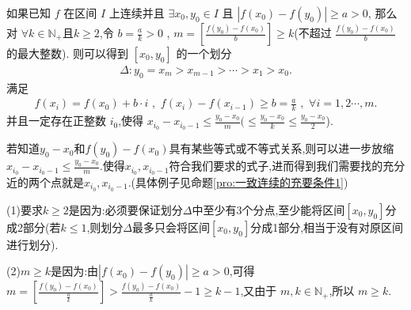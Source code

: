 \documentclass[lang=cn,newtx,10pt,scheme=chinese]{../Template/elegantbook}
\begin{document}
\begin{proposition}\label{pro:连续函数在固定的两点之间寻找充分近的两点,同时保持两点函数值之差足够大}
    如果已知 \(f\) 在区间 \(I\) 上连续并且 \(\exists x_0,y_0\in I\) 且 \(\left| f\left( x_0 \right) -f\left( y_0 \right) \right|\geq a>0\),
    那么对 \(\forall k\in \mathbb{N} _+\)且$k\ge2$,令 \(b = \frac{a}{k}>0\)\,\,,\,\,\(m=\left[ \frac{f\left( y_0 \right) -f\left( x_0 \right)}{b} \right]\geq k\)(不超过 \(\frac{f\left( y_0 \right) -f\left( x_0 \right)}{b}\) 的最大整数).
则可以得到 \(\left[ x_0,y_0 \right]\) 的一个划分 
\begin{align*}
\Delta :y_0=x_m>x_{m - 1}>\cdots >x_1>x_0.
\end{align*}
满足 \begin{align*}
    f\left( x_i \right) = f\left( x_0 \right) + b\cdot i\,\,,\,\,f\left( x_i \right) - f\left( x_{i - 1} \right) \geq b=\frac{a}{k}\,\,,\,\,\forall i = 1,2\cdots,m.
\end{align*}
并且一定存在正整数 \(i_0\),使得 \(x_{i_0}-x_{i_0 - 1}\leq \frac{y_0 - x_0}{m}(\leq \frac{y_0 - x_0}{k}\leq \frac{y_0 - x_0}{2}\)).
\end{proposition}
\begin{remark}
    若知道$y_0-x_0$和$f(y_0)-f(x_0)$具有某些等式或不等式关系,则可以进一步放缩\(x_{i_0}-x_{i_0 - 1}\leq \frac{y_0 - x_0}{m}\).使得$x_{i_0},x_{i_0 - 1}$符合我们要求的式子,进而得到我们需要找的充分近的两个点就是$x_{i_0},x_{i_0 - 1}$.(具体例子见命题\ref{pro:一致连续的充要条件1})
\end{remark}
\begin{note}
   (1)要求$k\ge2$是因为:必须要保证划分$\Delta$中至少有3个分点,至少能将区间$[x_0,y_0]$分成2部分(若$k\le1$,则划分$\Delta$最多只会将区间$[x_0,y_0]$分成1部分,相当于没有对原区间进行划分).

   (2)$m\geq k$是因为:由\(\left| f\left( x_0 \right) -f\left( y_0 \right) \right|\geq a>0\),可得\(m=\left[ \frac{f\left( y_0 \right) -f\left( x_0 \right)}{\frac{a}{k}} \right] >\frac{f\left( y_0 \right) -f\left( x_0 \right)}{\frac{a}{k}} - 1\geq k - 1\),又由于 \(m,k\in \mathbb{N} _+\),所以 \(m\geq k\).
\end{note} 
\end{document}
